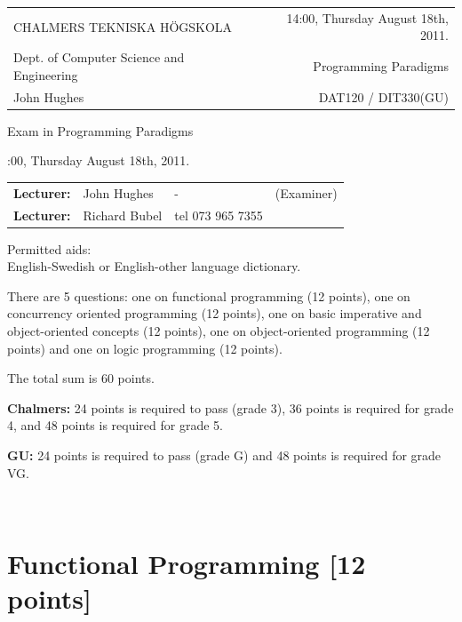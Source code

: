 \documentclass{article}
\begin{document}
\newcommand{\examtime}{14:00, Thursday August 18th, 2011}
\newcommand{\points}[1]{\marginpar{\bf #1 points}}
\noindent
\begin{tabular}{lr}
CHALMERS TEKNISKA H\"OGSKOLA &\examtime{}.\\
Dept. of Computer Science and Engineering & Programming Paradigms\\
John Hughes                  & DAT120 / DIT330(GU) \\
\end{tabular}

\vspace{2.5cm} \noindent
\begin{center} {\LARGE
Exam in Programming Paradigms}
\end{center}

\vspace{1.5cm}

\noindent
\examtime{}.\\
\begin{tabular}{lllc}
\textbf{Lecturer:} &  John Hughes  &  - & (Examiner)\\
\textbf{Lecturer:} & Richard Bubel & tel 073 965 7355 & \\ 
\end{tabular}
\vspace{1cm}

\noindent
Permitted aids:\\
English-Swedish or English-other language dictionary.

There are 5 questions: one on functional
programming (12 points), one on concurrency oriented programming (12
points), one on basic imperative and object-oriented concepts (12
points), one on object-oriented programming (12 points) and one on
logic programming (12 points).

The total sum is 60 points.


\textbf{Chalmers:}
24 points is required to pass (grade 3), 36 points is required for
grade 4, and 48 points is required for grade 5. 

\textbf{GU:}
24 points is required to pass (grade G) and 48 points is required for
grade VG.


\newpage
\hfill\\
\newpage

\section{Functional Programming [12 points]}
\end{document}
